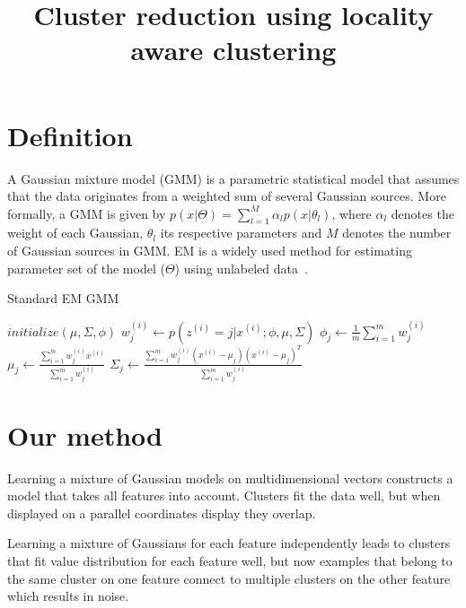 \documentclass[10pt,a4paper]{article}
\title{Cluster reduction using locality aware clustering}
\begin{document}
\maketitle
\section{Definition}
A Gaussian mixture model (GMM) is a parametric statistical model that assumes that the data originates from a weighted sum of several Gaussian sources. More formally, a GMM is given by
$p(x|\Theta) = \sum^M_{l=1}\alpha_lp(x|\theta_l)$, where $\alpha_l$ denotes the weight of each Gaussian, $\theta_l$ its respective parameters and  $M$ denotes the number of Gaussian sources in GMM. EM is a widely used method for estimating parameter set of the model ($\Theta$) using unlabeled data~\cite{dempster77}.

\begin{algorithm}
\caption{Standard EM GMM}
\begin{algorithmic}
\State $initialize(\mu, \Sigma, \phi)$
    \State $w_j^{(i)}\gets p(z^{(i)} = j|x^{(i)}; \phi, \mu, \Sigma)$
    \State
    \State $\phi_j\gets\frac{1}{m}\sum_{i=1}^{m}w_j^{(i)}$
    \State $\mu_j\gets\frac{\sum_{i=1}^mw_j^{(i)}x^{(i)}}{\sum_{i=1}^mw_j^{(i)}}$
    \State $\Sigma_j\gets\frac{\sum_{i=1}^mw_j^{(i)}(x^{(i)}-\mu_j)(x^{(i)}-\mu_j)^T}{\sum_{i=1}^mw_j^{(i)}}$
\EndFor
\EndFunction
\end{algorithmic}
\end{algorithm}

\section{Our method}
Learning a mixture of Gaussian models on multidimensional vectors constructs a model that takes all features into account. Clusters fit the data well, but when displayed on a parallel coordinates display they overlap.

Learning a mixture of Gaussians for each feature independently leads to clusters that fit value distribution for each feature well, but now examples that belong to the same cluster on one feature connect to multiple clusters on the other feature which results in noise.
\end{document}
